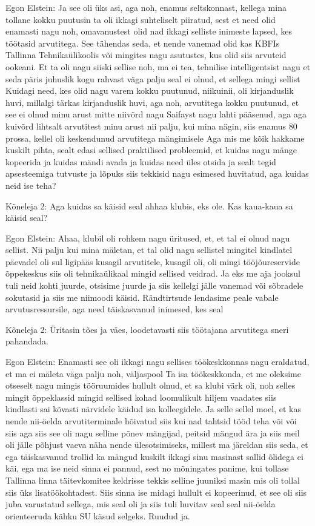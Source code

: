 Egon Elstein:
Ja see oli üks asi, aga noh, enamus seltskonnast, kellega mina tollane kokku puutusin ta oli ikkagi suhteliselt piiratud, sest et need olid enamasti nagu noh, omavanustest olid nad ikkagi selliste inimeste lapsed, kes töötasid arvutitega. See tähendas seda, et nende vanemad olid kas KBFIs Tallinna Tehnikaülikoolis või mingites nagu asutustes, kus olid siis arvuteid ookeani. Et ta oli nagu siiski sellise noh, ma ei tea, tehnilise intelligentsist nagu et seda päris juhuslik kogu rahvast väga palju seal ei olnud, et sellega mingi sellist
Kuidagi need, kes olid nagu varem kokku puutunud, niikuinii, oli kirjanduslik huvi, millalgi tärkas kirjanduslik huvi, aga noh, arvutitega kokku puutunud, et see ei olnud minu arust mitte niivõrd nagu Saifayst nagu lahti pääsenud, aga aga kuivõrd lihtsalt arvutitest minu arust nii palju, kui mina nägin, siis enamus 80 prossa, kellel oli keskendunud arvutitega mängimisele
Aga mis me kõik hakkame kuskilt pihta, sealt edasi sellised praktilised probleemid, et kuidas nagu mänge kopeerida ja kuidas mändi avada ja kuidas need üles otsida ja sealt tegid apsesteemiga tutvuste ja lõpuks siis tekkisid nagu esimesed huvitatud, aga kuidas neid ise teha?
                 
Kõneleja 2:
Aga kuidas sa käisid seal ahhaa klubis, eks ole. Kas kaua-kaua sa käisid seal?
                 
Egon Elstein:
Ahaa, klubil oli rohkem nagu üritused, et, et tal ei olnud nagu sellist. Nii palju kui mina mäletan, et tal olid nagu sellistel mingitel kindlatel päevadel oli sul ligipääs kusagil arvutitele, kusagil oli, oli mingi tööjõureservide õppekeskus siis oli tehnikaülikaal mingid sellised veidrad.
Ja eks me aja jooksul tuli neid kohti juurde, otsisime juurde ja siis kellelgi jälle vanemad või sõbradele sokutasid ja siis me niimoodi käisid. Rändtirtsude lendasime peale vabale arvutusressursile, aga need täiskasvanud inimesed, kes seal
                 
Kõneleja 2:
Üritasin tões ja väes, loodetavasti siis töötajana arvutitega sneri pahandada.
                 
Egon Elstein:
Enamasti see oli ikkagi nagu sellises töökeskkonnas nagu eraldatud, et ma ei mäleta väga palju noh, väljaspool Ta isa töökeskkonda, et me oleksime otseselt nagu mingis tööruumides hullult olnud, et sa klubi värk oli, noh selles mingit õppeklassid mingid sellised kohad loomulikult hiljem vaadates siis kindlasti sai kõvasti närvidele käidud isa kolleegidele.
Ja selle sellel moel, et kas nende nii-öelda arvutiterminale hõivatud siis kui nad tahtsid tööd teha või või siis aga siis see oli nagu selline põnev mängijad, peitsid mängud ära ja siis meil oli jälle põhjust vaeva näha nende ülesotsimiseks, millest ma järeldan siis seda, et ega täiskasvanud trollid ka mängud kuskilt ikkagi sinu masinast sallid õlidega ei käi, ega ma ise neid sinna ei pannud, sest no mõningates panime, kui tollase Tallinna linna täitevkomitee keldrisse tekkis selline juuniksi masin mis oli tollal siis üks lisatöökohtadest.
Siis sinna ise midagi hullult ei kopeerinud, et see oli siis juba varustatud sellega, mis seal oli ja siis tuli huvitav seal seal nii-öelda orienteeruda kähku SU käsud selgeks.
Ruudud ja.
                 
